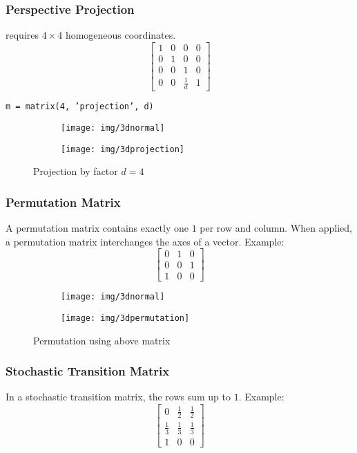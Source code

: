 \documentclass{scrartcl}
\begin{document}
\subsubsection*{Perspective Projection}
requires $4 \times 4$ homogeneous coordinates.
$$\left[ \begin{smallmatrix} 
1 & 0 & 0 & 0\\
0 & 1 & 0 & 0\\
0 & 0 & 1 & 0\\
0 & 0 & \frac{1}{d} & 1 
\end{smallmatrix} \right]$$
\begin{center}
	\texttt{m = matrix(4, 'projection', d)}
\end{center}
\begin{figure}[H]
	\centering
	\begin{subfigure}{.41\textwidth}
		\centering
		\texttt{[image: img/3dnormal]}
	\end{subfigure}%
	\begin{subfigure}{.41\textwidth}
		\centering
		\texttt{[image: img/3dprojection]}
	\end{subfigure}
	\caption{Projection by factor $d = 4$}
	\label{fig:rot}
\end{figure}

\subsubsection*{Permutation Matrix}
A permutation matrix contains exactly one $1$ per row and column. When applied, a permutation matrix interchanges the axes of a vector.
Example: $$\left[ \begin{smallmatrix} 
0 & 1 & 0\\
0 & 0 & 1\\
1 & 0 & 0
\end{smallmatrix} \right]$$
\begin{figure}[H]
	\centering
	\begin{subfigure}{.41\textwidth}
		\centering
		\texttt{[image: img/3dnormal]}
	\end{subfigure}%
	\begin{subfigure}{.41\textwidth}
		\centering
		\texttt{[image: img/3dpermutation]}
	\end{subfigure}
	\caption{Permutation using above matrix}
	\label{fig:rot}
\end{figure}

\subsubsection*{Stochastic Transition Matrix}
In a stochastic transition matrix, the rows sum up to $1$. Example:
$$\left[ \begin{smallmatrix} 
0 & \frac{1}{2} & \frac{1}{2}\\
\frac{1}{3} & \frac{1}{3} & \frac{1}{3}\\
1 & 0 & 0
\end{smallmatrix} \right]$$
\end{document}
